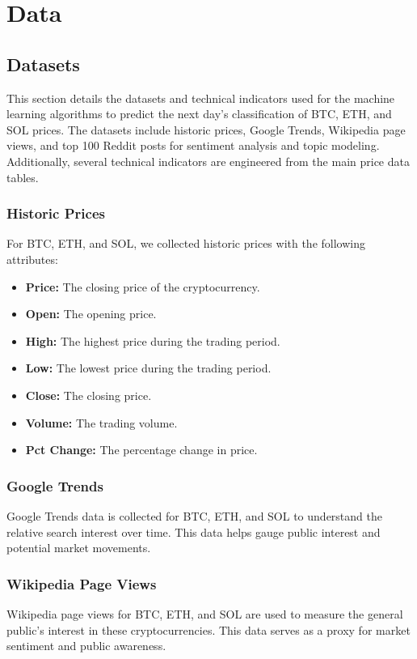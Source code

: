 \chapter{Data}

\section{Datasets}
This section details the datasets and technical indicators used for the machine learning algorithms to predict the next day's classification of BTC, ETH, and SOL prices. The datasets include historic prices, Google Trends, Wikipedia page views, and top 100 Reddit posts for sentiment analysis and topic modeling. Additionally, several technical indicators are engineered from the main price data tables.

\subsection{Historic Prices}
For BTC, ETH, and SOL, we collected historic prices with the following attributes:
\begin{itemize}
    \item \textbf{Price:} The closing price of the cryptocurrency.
    \item \textbf{Open:} The opening price.
    \item \textbf{High:} The highest price during the trading period.
    \item \textbf{Low:} The lowest price during the trading period.
    \item \textbf{Close:} The closing price.
    \item \textbf{Volume:} The trading volume.
    \item \textbf{Pct Change:} The percentage change in price.
\end{itemize}

\subsection{Google Trends}
Google Trends data is collected for BTC, ETH, and SOL to understand the relative search interest over time. This data helps gauge public interest and potential market movements.

\subsection{Wikipedia Page Views}
Wikipedia page views for BTC, ETH, and SOL are used to measure the general public's interest in these cryptocurrencies. This data serves as a proxy for market sentiment and public awareness.

